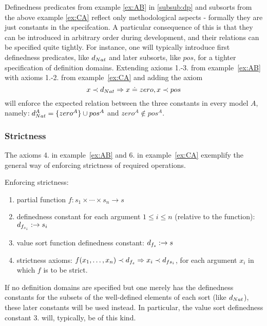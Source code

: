 \documentclass[10pt]{article}
\begin{document}
Definedness predicates from example \ref{ex:AB} in \ref{subsub:dp} and
subsorts from the above example \ref{ex:CA} reflect only methodological
aspects - formally they are just constants in the specifcation. A particular
consequence of this is that they can be introduced in arbitrary order during
development, and their relations can be specified quite tightly. For
instance, one will typically introduce first definedness predicates, like
$d_{Nat}$ and later subsorts, like $pos$, for a tighter specification of
definition domains. Extending axioms 1.-3. from example~\ref{ex:AB} with
axioms 1.-2. from example~\ref{ex:CA} and adding the axiom
\[x\prec d_{Nat}\Rightarrow x\mathrel{\dot{=} } zero, x\prec pos\]
will enforce the expected relation between the three constants in every
model $A$, namely$: d_{Nat}^A=\{zero^A\}\cup pos^A$ and $zero^A\not\in pos^A$.

\subsubsection{Strictness}
The axioms 4. in example~\ref{ex:AB} and 6. in example~\ref{ex:CA}
exemplify the general way of enforcing strictness of
required operations.

\begin{schem}\label{sch:strictB}
Enforcing strictness:
\begin{enumerate}\MyLPar
	\item partial function $f: s_1 \times \cdots \times s_n \to s$ 
	\item definedness constant for each argument $1\leq i\leq n$ (relative to the function):
	      $d_{f_{s_i}}: \to s_i$
	\item value sort function definedness constant: $d_{f_s}: \to s$ 
	\item strictness axioms: $f(x_1, \ldots ,x_n) \prec d_{f_s} \Rightarrow
	x_i \prec {d_{f{s_i}}}$, for each argument $x_i$ in which $f$ is to be strict.
\end{enumerate}
\end{schem}
If no definition domains are specified but one merely has the
definedness constants for the subsets of the well-defined elements of each
sort (like $d_{Nat}$), these later constants will be used instead. In
particular, the value sort definedness constant 3. will, typically, be of this kind.
\end{document}
